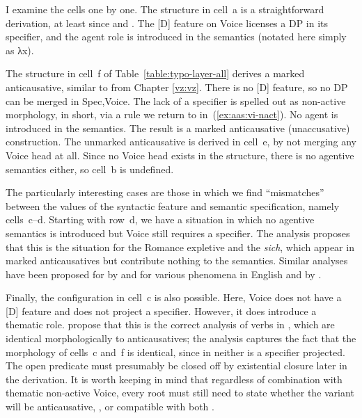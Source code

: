 \begin{exe}
\begin{xlist}
\begin{exe}
\begin{exe}
\begin{xlist}
\begin{exe}
I examine the cells one by one. The structure in cell~a is a straightforward  derivation, at least since \cite{kratzer96} and \citep{pylkkanen08}. The [D] feature on Voice licenses a DP in its specifier, and the agent role is introduced in the semantics (notated here simply as λx).

The structure in cell~f of Table~\ref{table:typo-layer-all} derives a marked anticausative, similar to {\tnif} from Chapter \ref{vz:vz}. There is no [D] feature, so no DP can be merged in Spec,Voice. The lack of a specifier is spelled out as non-active morphology,  in short, via a rule we return to in~(\ref{ex:aas:vi-nact}). No agent is introduced in the semantics. The result is a marked anticausative (unaccusative) construction. The unmarked anticausative is derived in cell~e, by not merging any Voice head at all. Since no Voice head exists in the structure, there is no agentive semantics either, so cell~b is undefined.

The particularly interesting cases are those in which we find ``mismatches'' between the values of the syntactic feature and semantic specification, namely cells~c--d. Starting with row~d, we have a situation in which no agentive semantics is introduced but Voice still requires a specifier. The  analysis proposes that this is the situation for the Romance expletive  and the  \emph{sich}, which appear in marked anticausatives but contribute nothing to the semantics. Similar analyses have been proposed for  by \cite{wood14nllt,wood15springer} and for various phenomena in English and  by \cite{myler16mit}.

Finally, the configuration in cell~c is also possible. Here, Voice does not have a [D] feature and does not project a specifier. However, it does introduce a thematic role. \cite{layering15} propose that this is the correct analysis of  verbs in , which are identical morphologically to anticausatives; the analysis captures the fact that the morphology of cells~c and~f is identical, since in neither  is a specifier projected. The open predicate must presumably be closed off by existential closure later in the derivation. It is worth keeping in mind that regardless of combination with thematic non-active Voice, every root must still need to state whether the  variant will be anticausative, , or compatible with both \citep[88]{alexiadouanagnostopoulou04,layering15}.



\end{exe}
\end{xlist}
\end{exe}
\end{exe}
\end{xlist}
\end{exe}
